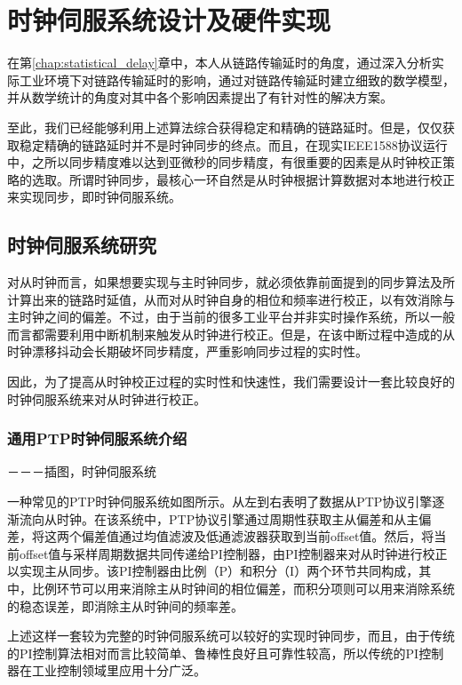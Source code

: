
\chapter{时钟伺服系统设计及硬件实现}
在第\ref{chap:statistical_delay}章中，本人从链路传输延时的角度，通过深入分析实际工业环境下对链路传输延时的影响，通过对链路传输延时建立细致的数学模型，并从数学统计的角度对其中各个影响因素提出了有针对性的解决方案。

至此，我们已经能够利用上述算法综合获得稳定和精确的链路延时。但是，仅仅获取稳定精确的链路延时并不是时钟同步的终点。而且，在现实IEEE1588协议运行中，之所以同步精度难以达到亚微秒的同步精度，有很重要的因素是从时钟校正策略的选取。所谓时钟同步，最核心一环自然是从时钟根据计算数据对本地进行校正来实现同步，即时钟伺服系统。

\section{时钟伺服系统研究}
对从时钟而言，如果想要实现与主时钟同步，就必须依靠前面提到的同步算法及所计算出来的链路时延值，从而对从时钟自身的相位和频率进行校正，以有效消除与主时钟之间的偏差。不过，由于当前的很多工业平台并非实时操作系统，所以一般而言都需要利用中断机制来触发从时钟进行校正。但是，在该中断过程中造成的从时钟漂移抖动会长期破坏同步精度，严重影响同步过程的实时性。

因此，为了提高从时钟校正过程的实时性和快速性，我们需要设计一套比较良好的时钟伺服系统来对从时钟进行校正。

\subsection{通用PTP时钟伺服系统介绍}
－－－插图，时钟伺服系统

一种常见的PTP时钟伺服系统如图所示。从左到右表明了数据从PTP协议引擎逐渐流向从时钟。在该系统中，PTP协议引擎通过周期性获取主从偏差和从主偏差，将这两个偏差值通过均值滤波及低通滤波器获取到当前offset值。然后，将当前offset值与采样周期数据共同传递给PI控制器，由PI控制器来对从时钟进行校正以实现主从同步。该PI控制器由比例（P）和积分（I）两个环节共同构成，其中，比例环节可以用来消除主从时钟间的相位偏差，而积分项则可以用来消除系统的稳态误差，即消除主从时钟间的频率差。

上述这样一套较为完整的时钟伺服系统可以较好的实现时钟同步，而且，由于传统的PI控制算法相对而言比较简单、鲁棒性良好且可靠性较高，所以传统的PI控制器在工业控制领域里应用十分广泛。

